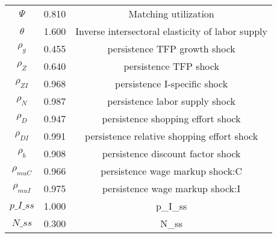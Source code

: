 \begin{center}
\begin{longtable}{ccc}
${\Psi}$ 	 & 	 0.810 	 & 	 Matching utilization\\
${\theta}$ 	 & 	 1.600 	 & 	 Inverse intersectoral elasticity of labor supply\\
${\rho_g}$ 	 & 	 0.455 	 & 	 persistence TFP growth shock\\
${\rho_Z}$ 	 & 	 0.640 	 & 	 persistence TFP shock\\
${\rho_{ZI}}$ 	 & 	 0.968 	 & 	 persistence I-specific shock\\
${\rho_N}$ 	 & 	 0.987 	 & 	 persistence labor supply shock\\
${\rho_D}$ 	 & 	 0.947 	 & 	 persistence shopping effort shock\\
${\rho_{DI}}$ 	 & 	 0.991 	 & 	 persistence relative shopping effort shock\\
${\rho_b}$ 	 & 	 0.908 	 & 	 persistence discount factor shock\\
${\rho_{muC}}$ 	 & 	 0.966 	 & 	 persistence wage markup shock:C\\
${\rho_{muI}}$ 	 & 	 0.975 	 & 	 persistence wage markup shock:I\\
$p\_I\_ss$ 	 & 	 1.000 	 & 	 p\_I\_ss\\
$N\_ss$ 	 & 	 0.300 	 & 	 N\_ss\\
\bottomrule%
\end{longtable}
\end{center}
